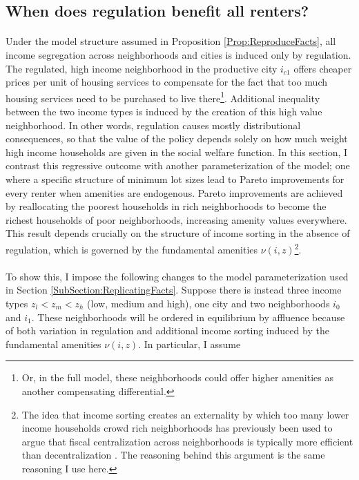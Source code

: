 \documentclass[11pt]{article}
\begin{document}
\subsection{When does regulation benefit all renters?}\label{Theory:Externality}

	\paragraph*{}
	Under the model structure assumed in Proposition \ref{Prop:ReproduceFacts}, all income segregation across neighborhoods and cities is induced only by regulation. The regulated, high income neighborhood in the productive city $i_{c1}$ offers cheaper prices per unit of housing services to compensate for the fact that too much housing services need to be purchased to live there\footnote{Or, in the full model, these neighborhoods could offer higher amenities as another compensating differential.}. Additional inequality between the two income types is induced by the creation of this high value neighborhood. In other words, regulation causes mostly distributional consequences, so that the value of the policy depends solely on how much weight high income households are given in the social welfare function. In this section, I contrast this regressive outcome with another parameterization of the model; one where a specific structure of minimum lot sizes lead to Pareto improvements for every renter when amenities are endogenous. Pareto improvements are achieved by reallocating the poorest households in rich neighborhoods to become the richest households of poor neighborhoods, increasing amenity values everywhere. This result depends crucially on the structure of income sorting in the absence of regulation, which is governed by the fundamental amenities $\nu(i, z)$\footnote{The idea that income sorting creates an externality by which too many lower income households crowd rich neighborhoods has previously been used to argue that fiscal centralization across neighborhoods is typically more efficient than decentralization \citep{ineffTiebout}. The reasoning behind this argument is the same reasoning I use here.}. 
		
	\paragraph*{}
	To show this, I impose the following changes to the model parameterization used in Section \ref{SubSection:ReplicatingFacts}. Suppose there is instead three income types $z_{l} < z_{m} < z_{h}$ (low, medium and high), one city and two neighborhoods $i_{0}$ and $i_{1}$. These neighborhoods will be ordered in equilibrium by affluence because of both variation in regulation and additional income sorting induced by the fundamental amenities $\nu(i, z)$. In particular, I assume 
	
\end{document}

